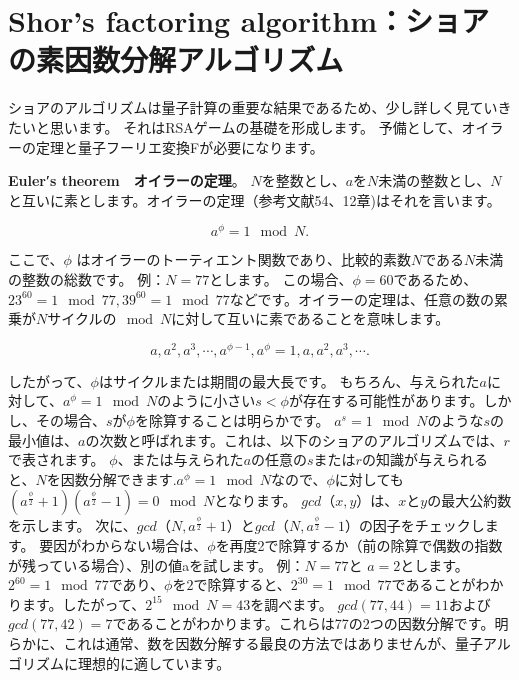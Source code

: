 \section{Shor’s factoring algorithm：ショアの素因数分解アルゴリズム}

ショアのアルゴリズムは量子計算の重要な結果であるため、少し詳しく見ていきたいと思います。 それはRSAゲームの基礎を形成します。 予備として、オイラーの定理と量子フーリエ変換Fが必要になります。 

\textbf{Euler′s theorem　オイラーの定理}。
$N$を整数とし、$a$を$N$未満の整数とし、$N$と互いに素とします。オイラーの定理（参考文献54、12章)はそれを言います。

\begin{equation}
\label{102}
a^\phi = 1 \mod N.
\end{equation}

ここで、$\phi$ はオイラーのトーティエント関数であり、比較的素数$N$である$N$未満の整数の総数です。 例：$N = 77$とします。 この場合、$\phi= 60$であるため、$23^{60} = 1 \mod 77, 39^{60} = 1 \mod 77$などです。オイラーの定理は、任意の数の累乗が$N$サイクルの$\mod N$に対して互いに素であることを意味します。

\begin{equation}
\label{103}
a, a^2, a^3, \cdots, a^{\phi -1}, a^\phi = 1, a, a^2, a^3, \cdots.
\end{equation}

したがって、$\phi$はサイクルまたは期間の最大長です。 もちろん、与えられた$a$に対して、$a^\phi = 1 \mod N$のように小さい$s < \phi $が存在する可能性があります。しかし、その場合、$s$が$\phi$を除算することは明らかです。 $a^s = 1 \mod N$のような$s$の最小値は、$a$の次数と呼ばれます。これは、以下のショアのアルゴリズムでは、$r$で表されます。
$\phi$、または与えられた$a$の任意の$s$または$r$の知識が与えられると、$N$を因数分解できます.$a^\phi = 1 \mod N$なので、$\phi$に対しても$ ( a^{\frac{\phi}{2}} +1)( a^{\frac{\phi}{2}} -1) = 0 \mod N$となります。 $gcd（x,y）$は、$x$と$y$の最大公約数を示します。
次に、$gcd（N, a^{\frac{\phi}{2}} +1）$と$gcd（N, a^{\frac{\phi}{2}} -1）$の因子をチェックします。 要因がわからない場合は、$\phi$を再度2で除算するか（前の除算で偶数の指数が残っている場合）、別の値aを試します。 
例：$N = 77$と $a = 2$とします。 $2^{60} = 1 \mod 77$であり、$\phi$を$2$で除算すると、$2^{30} = 1 \mod 77$であることがわかります。したがって、$2^{15} \mod N = 43$を調べます。 $gcd(77,44)= 11$および$gcd(77,42)= 7$であることがわかります。これらは77の2つの因数分解です。明らかに、これは通常、数を因数分解する最良の方法ではありませんが、量子アルゴリズムに理想的に適しています。

